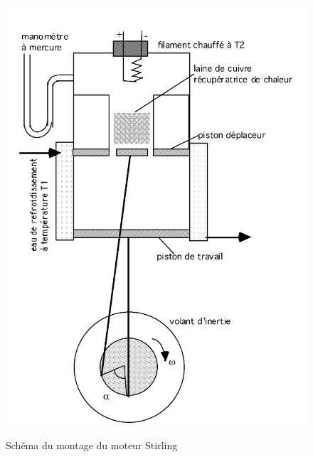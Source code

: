 \begin{figure}
    \centering
    \includegraphics[width=\linewidth]{figures/montage.png}
    \caption{Schéma du montage du moteur Stirling \cite{notice}}
    \label{fig:montage}
\end{figure}


